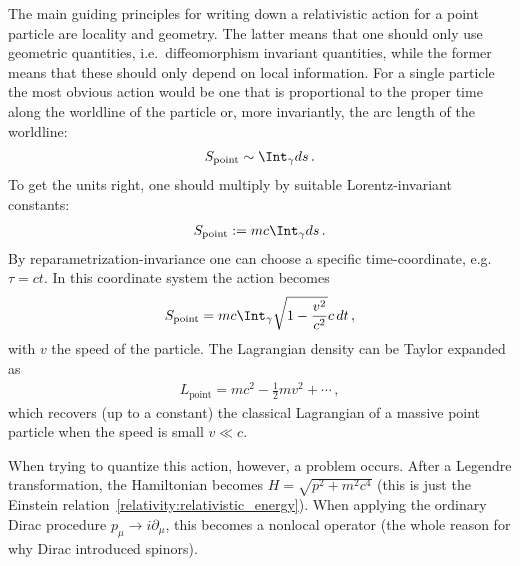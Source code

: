     The main guiding principles for writing down a relativistic action for a point particle are locality and geometry. The latter means that one should only use geometric quantities, i.e.~diffeomorphism invariant quantities, while the former means that these should only depend on local information. For a single particle the most obvious action would be one that is proportional to the proper time along the worldline of the particle or, more invariantly, the arc length of the worldline:
    \begin{gather}
        S_{\text{point}}\sim\Int_\gamma ds\,.
    \end{gather}
    To get the units right, one should multiply by suitable Lorentz-invariant constants:
    \begin{gather}
        \label{relativity:worldline_action}
        S_{\text{point}}:=mc\Int_\gamma ds\,.
    \end{gather}
    By reparametrization-invariance one can choose a specific time-coordinate, e.g.~$\tau=ct$. In this coordinate system the action becomes
    \begin{gather}
        S_{\text{point}}=mc\Int_\gamma\sqrt{1-\frac{v^2}{c^2}}c\,dt\,,
    \end{gather}
    with $v$ the speed of the particle. The Lagrangian density can be Taylor expanded as
    \begin{gather}
        L_{\text{point}}=mc^2 - \frac{1}{2}mv^2 + \cdots\,,
    \end{gather}
    which recovers (up to a constant) the classical Lagrangian of a massive point particle when the speed is small $v\ll c$.

    When trying to quantize this action, however, a problem occurs. After a Legendre transformation, the Hamiltonian becomes $H=\sqrt{p^2+m^2c^4}$ (this is just the Einstein relation~\ref{relativity:relativistic_energy}). When applying the ordinary Dirac procedure $p_\mu\longrightarrow i\partial_\mu$, this becomes a nonlocal operator (the whole reason for why Dirac introduced spinors).

